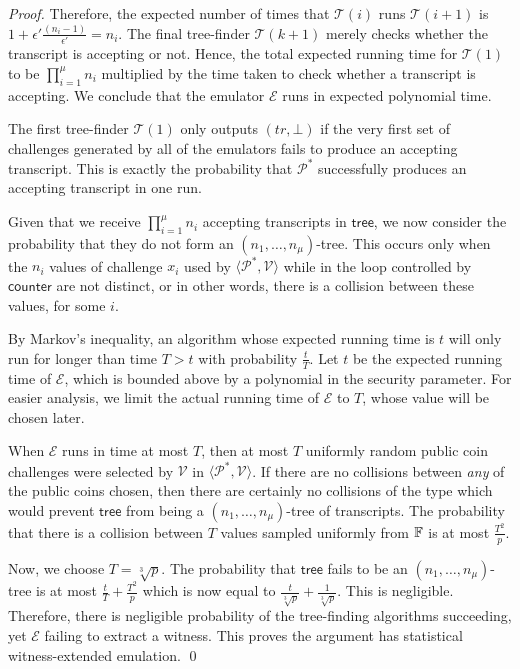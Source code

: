 \begin{proof}
Therefore, the expected number of times that $\mathcal{T}(i)$ runs $\mathcal{T}(i+1)$ is $1+\epsilon' \frac{(n_i-1)}{\epsilon'} = n_i$. The final tree-finder $\mathcal{T}(k+1)$ merely checks whether the transcript is accepting or not. Hence, the total expected running time for $\mathcal{T}(1)$ to be $\prod_{i=1}^{\mu} n_i$ multiplied by the time taken to check whether a transcript is accepting. We conclude that the emulator $\mathcal{E}$ runs in expected polynomial time.

The first tree-finder $\mathcal{T}(1)$ only outputs $(tr,\bot)$  if the very first set of challenges generated by all of the emulators fails to produce an accepting transcript. This is exactly the probability that $\mathcal{P}^*$ successfully produces an accepting transcript in one run.

Given that we receive $\prod_{i=1}^\mu n_i$ accepting transcripts in $\mathsf{tree}$, we now consider the probability that they do not form an $(n_1,\ldots,n_\mu)$-tree. This occurs only when the $n_{i}$ values of challenge $x_{i}$ used by $\langle \mathcal{P}^*, \mathcal{V}\rangle$ while in the loop controlled by $\mathsf{counter}$ are not distinct, or in other words, there is a collision between these values, for some $i$.

By Markov's inequality, an algorithm whose expected running time is $t$ will only run for longer than time $T>t$ with probability $\frac{t}{T}$. Let $t$ be the expected running time of $\mathcal{E}$, which is bounded above by a polynomial in the security parameter. For easier analysis, we limit the actual running time of $\mathcal{E}$ to $T$, whose value will be chosen later.

When $\mathcal{E}$ runs in time at most $T$, then at most $T$ uniformly random public coin challenges were selected by $\mathcal{V}$ in $\langle \mathcal{P}^*, \mathcal{V}\rangle$. If there are no collisions between \emph{any} of the public coins chosen, then there are certainly no collisions of the type which would prevent $\mathsf{tree}$ from being a $(n_1,\ldots,n_\mu)$-tree of transcripts. The probability that there is a collision between $T$ values sampled uniformly from $\mathbb{F}$ is at most $\frac{T^2}{p}$.

Now, we choose $T = \sqrt[3]{p}$. The probability that $\mathsf{tree}$ fails to be an $(n_1,\ldots,n_\mu)$-tree is at most $\frac{t}{T} + \frac{T^2}{p}$ which is now equal to $\frac{t}{\sqrt[3]{p}} + \frac{1}{\sqrt[3]{p}}$. This is negligible. Therefore, there is negligible probability of the tree-finding algorithms succeeding, yet $\mathcal{E}$ failing to extract a witness. This proves the argument has statistical witness-extended emulation. \qed
\end{proof}


